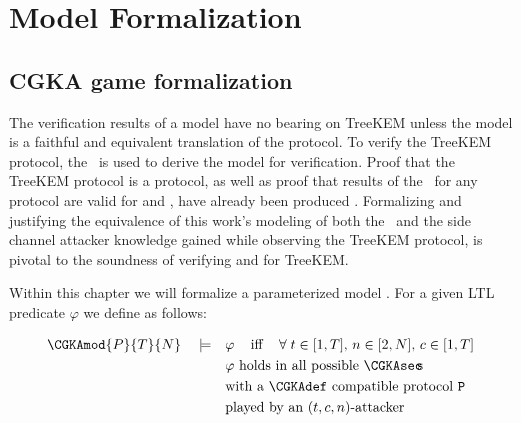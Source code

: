 \hypertarget{sec:model-formalization}{%
\chapter{Model Formalization}\label{sec:model-formalization}}


\hypertarget{sec:game-adaptations}{%
\section{CGKA game formalization}\label{sec:game-adaptations}}

The verification results of a model have no bearing on TreeKEM unless the model is a faithful and equivalent translation of the protocol.
To verify the TreeKEM protocol, the \CGKAsec\ is used to derive the model for verification.
Proof that the TreeKEM protocol is a  protocol, as well as proof that results of the \CGKAsec\ for any  protocol are valid for  and , have already been produced \autocite{alwen2020security}.
Formalizing and justifying the equivalence of this work's modeling of both the \CGKAsec\ and the side channel attacker knowledge gained while observing the TreeKEM protocol, is pivotal to the soundness of verifying  and  for TreeKEM.\@

Within this chapter we will formalize a parameterized model .
For a given LTL predicate $\varphi$ we define  as follows:

\[
\begin{split}
\CGKAmod{P}{T}{N}\quad\models\quad& \varphi \;\;\;\textrm{ iff }\;\;\;\forall\; t \in [1, T],\, n \in [2, N],\, c \in [1, T]\\
  & \varphi \textrm{ holds in all possible \CGKAsec\!\!s}\\
  & \textrm{with a \CGKAdef\ compatible protocol } \mathtt{P}\\
  & \textrm{played by an } (t, c, n)\textrm{-attacker}
\end{split}
\]


